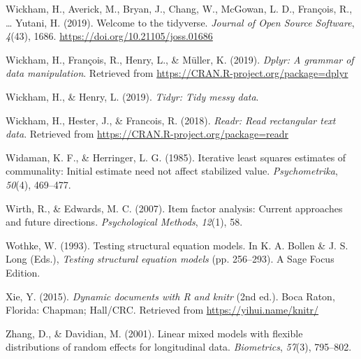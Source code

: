 \documentclass[
  english,
  man]{apa6}
\begin{document}
\leavevmode\hypertarget{ref-R-tidyverse}{}%
Wickham, H., Averick, M., Bryan, J., Chang, W., McGowan, L. D., François, R., \ldots{} Yutani, H. (2019). Welcome to the tidyverse. \emph{Journal of Open Source Software}, \emph{4}(43), 1686. \url{https://doi.org/10.21105/joss.01686}

\leavevmode\hypertarget{ref-R-dplyr}{}%
Wickham, H., François, R., Henry, L., \& Müller, K. (2019). \emph{Dplyr: A grammar of data manipulation}. Retrieved from \url{https://CRAN.R-project.org/package=dplyr}

\leavevmode\hypertarget{ref-R-tidyr}{}%
Wickham, H., \& Henry, L. (2019). \emph{Tidyr: Tidy messy data}.

\leavevmode\hypertarget{ref-R-readr}{}%
Wickham, H., Hester, J., \& Francois, R. (2018). \emph{Readr: Read rectangular text data}. Retrieved from \url{https://CRAN.R-project.org/package=readr}

\leavevmode\hypertarget{ref-widaman1985iterative}{}%
Widaman, K. F., \& Herringer, L. G. (1985). Iterative least squares estimates of communality: Initial estimate need not affect stabilized value. \emph{Psychometrika}, \emph{50}(4), 469--477.

\leavevmode\hypertarget{ref-wirth2007item}{}%
Wirth, R., \& Edwards, M. C. (2007). Item factor analysis: Current approaches and future directions. \emph{Psychological Methods}, \emph{12}(1), 58.

\leavevmode\hypertarget{ref-wothke1993}{}%
Wothke, W. (1993). Testing structural equation models. In K. A. Bollen \& J. S. Long (Eds.), \emph{Testing structural equation models} (pp. 256--293). A Sage Focus Edition.

\leavevmode\hypertarget{ref-R-knitr}{}%
Xie, Y. (2015). \emph{Dynamic documents with R and knitr} (2nd ed.). Boca Raton, Florida: Chapman; Hall/CRC. Retrieved from \url{https://yihui.name/knitr/}

\leavevmode\hypertarget{ref-zhang2001}{}%
Zhang, D., \& Davidian, M. (2001). Linear mixed models with flexible distributions of random effects for longitudinal data. \emph{Biometrics}, \emph{57}(3), 795--802.

\endgroup


\clearpage
\renewcommand{\listfigurename}{Figure captions}

\clearpage
\renewcommand{\listtablename}{Table captions}


\clearpage
\makeatletter
\efloat@restorefloats
\makeatother
\end{document}

